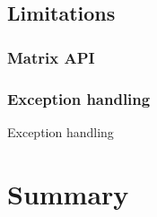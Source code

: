 






\subsection{Limitations}

\subsubsection{Matrix API}


\subsubsection{Exception handling}
Exception handling



 
 

\section{Summary}